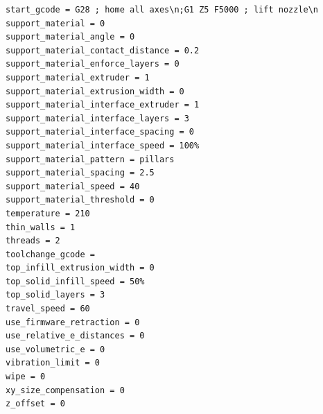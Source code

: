 \documentclass{iccmemoria}
\begin{document}
\begin{verbatim}
start_gcode = G28 ; home all axes\n;G1 Z5 F5000 ; lift nozzle\n
support_material = 0
support_material_angle = 0
support_material_contact_distance = 0.2
support_material_enforce_layers = 0
support_material_extruder = 1
support_material_extrusion_width = 0
support_material_interface_extruder = 1
support_material_interface_layers = 3
support_material_interface_spacing = 0
support_material_interface_speed = 100%
support_material_pattern = pillars
support_material_spacing = 2.5
support_material_speed = 40
support_material_threshold = 0
temperature = 210
thin_walls = 1
threads = 2
toolchange_gcode = 
top_infill_extrusion_width = 0
top_solid_infill_speed = 50%
top_solid_layers = 3
travel_speed = 60
use_firmware_retraction = 0
use_relative_e_distances = 0
use_volumetric_e = 0
vibration_limit = 0
wipe = 0
xy_size_compensation = 0
z_offset = 0
\end{verbatim}

\end{document}
